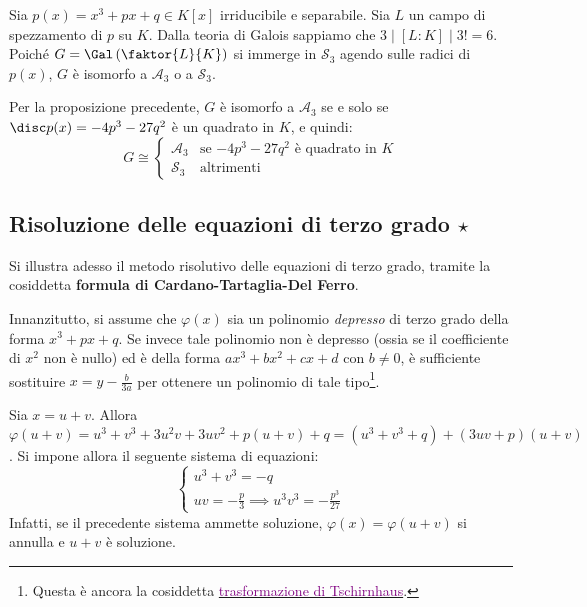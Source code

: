 \documentclass[11pt]{scrartcl}
\begin{document}
	\begin{example}
		Sia $p(x) = x^3 + px + q \in K[x]$ irriducibile e separabile. Sia $L$ un
		campo di spezzamento di $p$ su $K$. Dalla teoria di Galois sappiamo che
		$3 \mid [L : K] \mid 3! = 6$. Poiché $G = \Gal\left(\faktor{L}{K}\right)$ si
		immerge in $\mathcal{S}_3$ agendo sulle radici di $p(x)$, $G$ è isomorfo a $\mathcal{A}_3$
		o a $\mathcal{S}_3$. \medskip
		
		
		Per la proposizione precedente, $G$ è isomorfo a $\mathcal{A}_3$ se e solo
		se $\disc p(x) = -4p^3 - 27q^2$ è un quadrato in $K$, e quindi:
		\[ G \cong \begin{cases}
			\mathcal{A}_3 & \text{se $-4p^3-27q^2$ è quadrato in $K$} \\
			\mathcal{S}_3 & \text{altrimenti}
		\end{cases} \]  
	\end{example}
	
	\newpage
	\subsection{Risoluzione delle equazioni di terzo grado \texorpdfstring{$\star$}{★}}
	Si illustra adesso il metodo risolutivo delle equazioni di terzo grado,
	tramite la cosiddetta \textbf{formula di Cardano-Tartaglia-Del Ferro}.\medskip
	
	
	Innanzitutto, si
	assume che $\varphi(x)$ sia un polinomio \textit{depresso} di terzo grado
	della forma $x^3 + px + q$. Se invece tale polinomio non è depresso (ossia se il coefficiente
	di $x^2$ non è nullo) ed è della forma $ax^3 + bx^2 + cx + d$ con $b \neq 0$, è sufficiente sostituire $x = y - \frac{b}{3a}$ per
	ottenere un polinomio di tale tipo\footnote{
		Questa è ancora la cosiddetta \href{https://en.wikipedia.org/wiki/Tschirnhaus_transformation}{\textcolor{purple}{trasformazione di Tschirnhaus}}.
	}. \medskip
	
	
	Sia $x = u + v$. Allora $\varphi(u + v) = u^3 + v^3 + 3 u^2 v + 3 u v^2 + p(u + v) + q =
	(u^3 + v^3 + q) + (3uv + p)(u + v)$. Si impone allora il seguente sistema di
	equazioni:
	\[ \begin{cases}
		u^3 + v^3 = -q \\
		uv = -\frac{p}{3} \implies u^3 v^3 = - \frac{p^3}{27}
	\end{cases} \]
	Infatti, se il precedente sistema ammette soluzione, $\varphi(x) = \varphi(u + v)$ si annulla e
	$u + v$ è soluzione. \medskip
	
\end{document}
